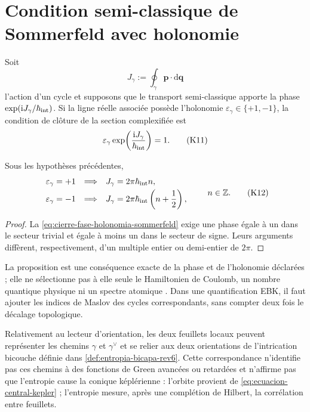 \section{Condition semi-classique de Sommerfeld avec holonomie}
\label{sec:sommerfeld-holonomia-banda}

Soit
\[
 J_\gamma:=\oint_\gamma\mathbf p\cdot\mathrm d\mathbf q
\]
l'action d'un cycle et supposons que le transport semi-classique apporte la
phase \(\exp(\mathrm iJ_\gamma/\hbar_{\rm int})\). Si la ligne réelle associée
possède l'holonomie \(\varepsilon_\gamma\in\{+1,-1\}\), la condition de clôture de
la section complexifiée est
\[
 \varepsilon_\gamma
 \exp\!\left(\frac{\mathrm iJ_\gamma}{\hbar_{\rm int}}\right)=1.
 \tag{K11}\label{eq:cierre-fase-holonomia-sommerfeld}
\]

\begin{proposition}
\label{prop:desplazamiento-sommerfeld-holonomia}
Sous les hypothèses précédentes,
\[
 \begin{array}{lll}
 \varepsilon_\gamma=+1
 &\Longrightarrow&
 J_\gamma=2\pi\hbar_{\rm int}n,\\[1mm]
 \varepsilon_\gamma=-1
 &\Longrightarrow&
 J_\gamma=2\pi\hbar_{\rm int}\left(n+\dfrac12\right),
 \end{array}
 \qquad n\in\mathbb Z.
 \tag{K12}\label{eq:cuantizacion-sommerfeld-holonomia}
\]
\end{proposition}

\begin{proof}
La \cref{eq:cierre-fase-holonomia-sommerfeld} exige une phase égale à un dans
le secteur trivial et égale à moins un dans le secteur de signe. Leurs arguments
diffèrent, respectivement, d'un multiple entier ou demi-entier de \(2\pi\).
\end{proof}

La proposition est une conséquence exacte de la phase et de l'holonomie
déclarées ; elle ne sélectionne pas à elle seule le Hamiltonien de Coulomb, un nombre
quantique physique ni un spectre atomique \cite{Sommerfeld1916}. Dans une
quantification EBK, il faut ajouter les indices de Maslov des cycles
correspondants, sans compter deux fois le décalage topologique.

Relativement au lecteur d'orientation, les deux feuillets locaux peuvent
représenter les chemins \(\gamma\) et \(\gamma^\vee\) et se relier aux
deux orientations de l'intrication bicouche définie dans
\cref{def:entropia-bicapa-rev6}. Cette correspondance n'identifie pas
ces chemins à des fonctions de Green avancées ou retardées et n'affirme pas que
l'entropie cause la conique képlérienne : l'orbite provient de
\eqref{eq:ecuacion-central-kepler} ; l'entropie mesure, après une
complétion de Hilbert, la corrélation entre feuillets.

